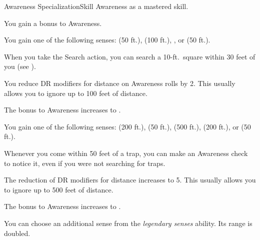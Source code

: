     \begin{feat}{Awareness Specialization}{Skill}
        \featpre Awareness as a mastered skill.

         You gain a  bonus to Awareness.

         You gain one of the following senses:  (50 ft.),  (100 ft.), , or  (50 ft.).

         When you take the Search action, you can search a 10-ft.\ square within 30 feet of you (see ).

         You reduce DR modifiers for distance on Awareness rolls by 2.
        This usually allows you to ignore up to 100 feet of distance.


         The bonus to Awareness increases to .

         You gain one of the following senses:  (200 ft.),  (50 ft.),  (500 ft.),  (200 ft.), or  (50 ft.).

         Whenever you come within 50 feet of a trap, you can make an Awareness check to notice it, even if you were not searching for traps.

         The reduction of DR modifiers for distance increases to 5.
        This usually allows you to ignore up to 500 feet of distance.

         The bonus to Awareness increases to .

         You can choose an additional sense from the \textit{legendary senses} ability.
        Its range is doubled.
    \end{feat}

